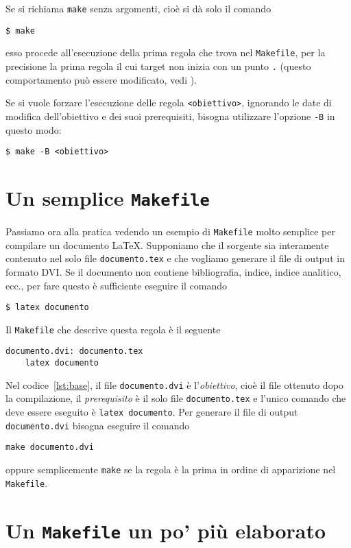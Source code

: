 Se si richiama \texttt{make} senza argomenti, cioè si dà solo il comando
\begin{verbatim}
$ make
\end{verbatim} %
esso procede all'esecuzione della prima regola che trova nel \texttt{Makefile},
per la precisione la prima regola il cui target non inizia con un punto \texttt{.}
(questo comportamento può essere modificato, vedi \textcite[5]{gnu:make}).

Se si vuole forzare l'esecuzione delle regola \texttt{<obiettivo>}, ignorando le
date di modifica dell'obiettivo e dei suoi prerequisiti, bisogna utilizzare
l'opzione \texttt{-B} in questo modo:
\begin{verbatim}
$ make -B <obiettivo>
\end{verbatim} %

\section{Un semplice \texttt{Makefile}}
\label{sec:makefile-semplice}

Passiamo ora alla pratica vedendo un esempio di \texttt{Makefile} molto semplice
per compilare un documento \LaTeX{}.
Supponiamo che il sorgente sia interamente contenuto nel solo file
\texttt{documento.tex} e che vogliamo generare il file di output in formato DVI.
Se il documento non contiene bibliografia, indice, indice analitico, ecc., per
fare questo è sufficiente eseguire il comando
\begin{verbatim}
$ latex documento
\end{verbatim} %
Il \texttt{Makefile} che descrive questa regola è il seguente
\begin{lstlisting}[caption={Un semplice \texttt{Makefile}.},label=lst:base]
documento.dvi: documento.tex
	latex documento
\end{lstlisting}
Nel codice~\ref{lst:base}, il file \texttt{documento.dvi} è l'\emph{obiettivo},
cioè il file ottenuto dopo la compilazione, il \emph{prerequisito} è il solo
file \texttt{documento.tex} e l'unico comando che deve essere eseguito è
\texttt{latex documento}.  Per generare il file di output \texttt{documento.dvi}
bisogna eseguire il comando
\begin{verbatim}
make documento.dvi
\end{verbatim}
oppure semplicemente \texttt{make} se la regola è la prima in ordine di
apparizione nel \texttt{Makefile}.

\section{Un \texttt{Makefile} un po' più elaborato}
\label{sec:makefile-elaborato}

